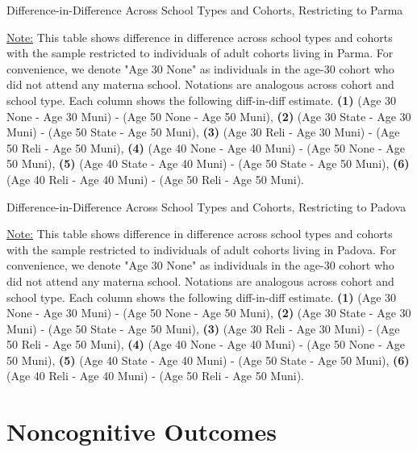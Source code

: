 \documentclass[11pt]{article}
\begin{document}
\begin{table}[H]
\begin{center}
	\caption{Difference-in-Difference Across School Types and Cohorts, Restricting to Parma}
	\scalebox{0.83}{
		}
\end{center}
\footnotesize
\underline{Note:} This table shows difference in difference across school types and cohorts with the sample restricted to individuals of adult cohorts living in Parma. For convenience, we denote "Age 30 None" as individuals in the age-30 cohort who did not attend any materna school. Notations are analogous across cohort and school type. Each column shows the following diff-in-diff estimate. \textbf{(1)} (Age 30 None - Age 30 Muni) - (Age 50 None - Age 50 Muni), \textbf{(2)} (Age 30 State - Age 30 Muni) - (Age 50 State - Age 50 Muni), \textbf{(3)} (Age 30 Reli - Age 30 Muni) - (Age 50 Reli - Age 50 Muni), \textbf{(4)} (Age 40 None - Age 40 Muni) - (Age 50 None - Age 50 Muni),  \textbf{(5)} (Age 40 State - Age 40 Muni) - (Age 50 State - Age 50 Muni), \textbf{(6)} (Age 40 Reli - Age 40 Muni) - (Age 50 Reli - Age 50 Muni). 
\end{table}

\begin{table}[H]
\begin{center}
	\caption{Difference-in-Difference Across School Types and Cohorts, Restricting to Padova}
	\scalebox{0.83}{
		}
\end{center}
\footnotesize
\underline{Note:} This table shows difference in difference across school types and cohorts with the sample restricted to individuals of adult cohorts living in Padova. For convenience, we denote "Age 30 None" as individuals in the age-30 cohort who did not attend any materna school. Notations are analogous across cohort and school type. Each column shows the following diff-in-diff estimate. \textbf{(1)} (Age 30 None - Age 30 Muni) - (Age 50 None - Age 50 Muni), \textbf{(2)} (Age 30 State - Age 30 Muni) - (Age 50 State - Age 50 Muni), \textbf{(3)} (Age 30 Reli - Age 30 Muni) - (Age 50 Reli - Age 50 Muni), \textbf{(4)} (Age 40 None - Age 40 Muni) - (Age 50 None - Age 50 Muni),  \textbf{(5)} (Age 40 State - Age 40 Muni) - (Age 50 State - Age 50 Muni), \textbf{(6)} (Age 40 Reli - Age 40 Muni) - (Age 50 Reli - Age 50 Muni). 
\end{table}



\section{Noncognitive Outcomes}
\end{document}
